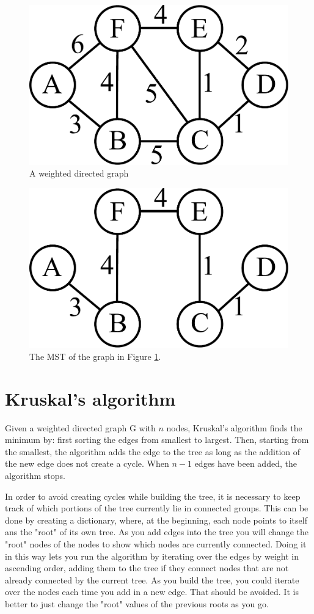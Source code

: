 \begin{figure}[H]
\includegraphics[width = .4\textwidth]{graph4.pdf}
\caption{A weighted directed graph}
\label{mst:graph4}
\end{figure}

\begin{figure}[H]
\includegraphics[width = .4\textwidth]{graph5.pdf}
\caption{The MST of the graph in Figure \ref{mst:graph4}.}
\end{figure}

\section*{Kruskal's algorithm}

Given a weighted directed graph G with $n$ nodes, Kruskal's algorithm finds the minimum by: first sorting the edges from smallest to largest.
Then, starting from the smallest, the algorithm adds the edge to the tree as long as the addition of the new edge does not create a cycle.
When $n-1$ edges have been added, the algorithm stops.

In order to avoid creating cycles while building the tree, it is necessary to keep track of which portions of the tree currently lie in connected groups.
This can be done by creating a dictionary, where, at the beginning, each node points to itself ans the "root" of its own tree.
As you add  edges into the tree you will change the "root" nodes of the nodes to show which nodes are currently connected.
Doing it in this way lets you run the algorithm by iterating over the edges by weight in ascending order, adding them to the tree if they connect nodes that are not already connected by the current tree.
As you build the tree, you could iterate over the nodes each time you add in a new edge.
That should be avoided.
It  is better to just change the "root" values of the previous roots as you go.

